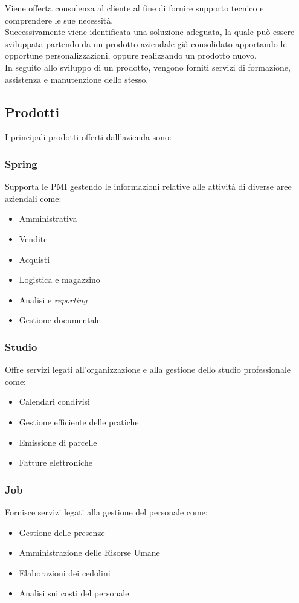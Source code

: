 Viene offerta consulenza al cliente al fine di fornire supporto tecnico e comprendere le sue necessità.\\
Successivamente viene identificata una soluzione adeguata, la quale può essere sviluppata partendo da un prodotto aziendale già consolidato apportando le opportune personalizzazioni, oppure realizzando un prodotto nuovo.\\
In seguito allo sviluppo di un prodotto, vengono forniti servizi di formazione, assistenza e manutenzione dello stesso.\\

\subsection{Prodotti}
I principali prodotti offerti dall'azienda sono: 

\subsubsection*{Spring}
Supporta le \gls{PMI} gestendo le informazioni relative alle attività di diverse aree aziendali come: 

\begin{itemize}
    \item Amministrativa 
    \item Vendite 
    \item Acquisti 
    \item Logistica e magazzino
    \item Analisi e \emph{reporting}
    \item Gestione documentale
\end{itemize}

\subsubsection*{Studio}
Offre servizi legati all'organizzazione e alla gestione dello studio professionale come:
\begin{itemize}
    \item Calendari condivisi  
    \item Gestione efficiente delle pratiche 
    \item Emissione di parcelle  
    \item Fatture elettroniche 
\end{itemize}

\subsubsection*{Job}
Fornisce servizi legati alla gestione del personale come: 
\begin{itemize}
    \item Gestione delle presenze  
    \item Amministrazione delle Risorse Umane  
    \item Elaborazioni dei cedolini 
    \item Analisi sui costi del personale
\end{itemize}

